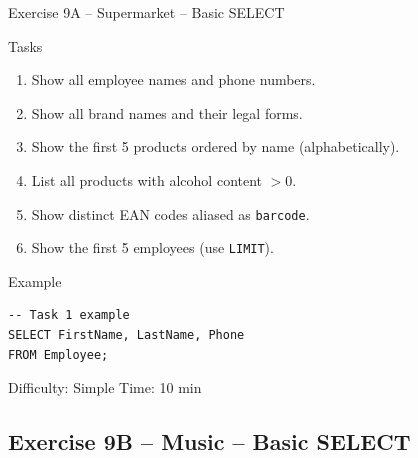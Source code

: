 \documentclass[10pt]{beamer}
\begin{document}
\begin{frame}[fragile]{Exercise 9A -- Supermarket -- Basic SELECT}
  \begin{block}{Tasks}
    \begin{enumerate}
      \item Show all employee names and phone numbers.
      \item Show all brand names and their legal forms.
      \item Show the first 5 products ordered by name (alphabetically).
      \item List all products with alcohol content $> 0$.
      \item Show distinct EAN codes aliased as \texttt{barcode}.
      \item Show the first 5 employees (use \texttt{LIMIT}).
    \end{enumerate}
  \end{block}

  \begin{block}{Example}
\begin{lstlisting}[style=sqlstyle]
-- Task 1 example
SELECT FirstName, LastName, Phone
FROM Employee;
\end{lstlisting}
  \end{block}

  \begin{alertblock}{Difficulty: Simple \quad Time: 10 min}
  \end{alertblock}
\end{frame}

\subsection{Exercise 9B -- Music -- Basic SELECT}
\end{document}
